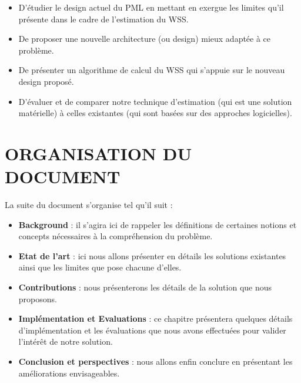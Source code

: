 \begin{itemize}[label=, font=\large \color{darkorange}]
    \item D'étudier le design actuel du PML en mettant en exergue les limites qu'il présente dans le cadre de l'estimation du WSS.
    \item De proposer une nouvelle architecture (ou design) mieux adaptée à ce problème.
    \item De présenter un algorithme de calcul du WSS qui s'appuie sur le nouveau design proposé.
    \item D'évaluer et de comparer notre technique d'estimation (qui est une solution matérielle) à celles existantes (qui sont basées sur des approches logicielles).
\end{itemize}

\section*{ORGANISATION DU DOCUMENT}
La suite du document s'organise tel qu'il suit : 
\begin{itemize}[label=, font=\large \color{darkorange}]
    \item \textbf{Background} : il s'agira ici de rappeler les définitions de certaines notions et concepts nécessaires à la compréhension du problème.
    \item \textbf{Etat de l'art} : ici nous allons présenter en détails les solutions existantes ainsi que les limites que pose chacune d'elles.
    \item \textbf{Contributions} : nous présenterons les détails de la solution que nous proposons.
    \item \textbf{Implémentation et Evaluations} : ce chapitre présentera quelques détails d’implémentation et les évaluations que nous avons effectuées pour valider l’intérêt de notre solution.
    \item \textbf{Conclusion et perspectives} : nous allons enfin conclure en présentant les améliorations envisageables.
\end{itemize}

